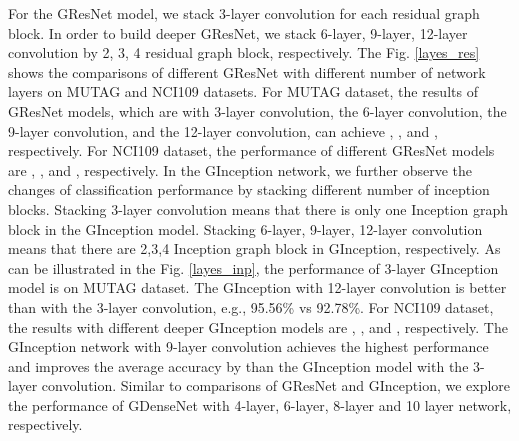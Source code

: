\documentclass[journal]{IEEEtran}
\begin{document}
For the G\underline{\hspace{0.5em}}ResNet model, we stack 3-layer convolution for each residual graph block.
In order to build deeper G\underline{\hspace{0.5em}}ResNet, we stack 6-layer, 9-layer, 12-layer convolution by 2, 3, 4 residual graph block, respectively.
The Fig. \ref{layes_res} shows the comparisons of different G\underline{\hspace{0.5em}}ResNet with different number of network layers on MUTAG and NCI109 datasets.
For MUTAG dataset, the results of G\underline{\hspace{0.5em}}ResNet models, which are with  3-layer convolution, the 6-layer convolution, the 9-layer convolution, and the 12-layer convolution, can achieve , ,  and , respectively.
For NCI109 dataset, the performance of different G\underline{\hspace{0.5em}}ResNet models are , ,  and , respectively.
In the G\underline{\hspace{0.5em}}Inception network, we further observe the changes of classification performance by stacking different number of inception blocks. Stacking 3-layer convolution means that there is only one Inception graph block in the G\underline{\hspace{0.5em}}Inception model.
Stacking 6-layer, 9-layer, 12-layer convolution means that there are 2,3,4 Inception graph block in G\underline{\hspace{0.5em}}Inception, respectively.
As can be illustrated in the Fig. \ref{layes_inp}, the performance of 3-layer G\underline{\hspace{0.5em}}Inception model is  on MUTAG dataset.
The G\underline{\hspace{0.5em}}Inception with 12-layer convolution is better than with the 3-layer convolution, e.g., 95.56\% vs 92.78\%.
For NCI109 dataset, the results with different deeper G\underline{\hspace{0.5em}}Inception models are , ,  and , respectively. The G\underline{\hspace{0.5em}}Inception network with 9-layer convolution achieves the highest performance  and improves the average accuracy by   than the G\underline{\hspace{0.5em}}Inception model with the 3-layer convolution.
Similar to comparisons of G\underline{\hspace{0.5em}}ResNet and G\underline{\hspace{0.5em}}Inception, we explore the performance of G\underline{\hspace{0.5em}}DenseNet with 4-layer, 6-layer, 8-layer and 10 layer network, respectively.
\end{document}
